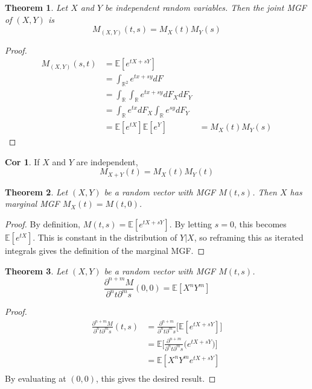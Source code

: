 \documentclass{article}
\newtheorem{theorem}{Theorem}
\theoremstyle{definition}\newtheorem{definition}{DEF}
\theoremstyle{lemma}\newtheorem{lemma}{Lemma}
\theoremstyle{corrolary}\newtheorem{corrolary}{Cor}
\begin{document}
\begin{theorem}
Let $X$ and $Y$ be independent random variables.
Then the joint MGF of $(X,Y)$ is
\begin{equation}
M_{(X,Y)}(t,s)=M_X(t)M_Y(s)
\end{equation}
\end{theorem}
\begin{proof}
\begin{align*}
M_{(X,Y)}(s,t)&=\mathbb{E}[e^{tX+sY}]\\
&=\int_{\mathbb{R}^2}e^{tx+sy}dF\\
&= \int_\mathbb{R}\int_\mathbb{R} e^{tx+sy}dF_X dF_Y\\
&=\int_\mathbb{R}e^{tx}dF_X \int_\mathbb{R} e^{sy}dF_Y\\
&=\mathbb{E}[e^{tX}] \mathbb{E}[e^{Y}]
&=M_X(t)M_Y(s)
\end{align*}
\end{proof}
\begin{corrolary}
If $X$ and $Y$ are independent,
\begin{equation}
M_{X+Y}(t)=M_X(t)M_Y(t)
\end{equation}
\end{corrolary}

\begin{theorem}
Let $(X,Y)$ be a random vector with MGF $M(t,s)$.
Then $X$ has marginal MGF $M_X(t)=M(t,0)$.
\end{theorem}
\begin{proof}
By definition, $M(t,s)=\mathbb{E}[e^{tX+sY}]$.
By letting $s=0$, this becomes $\mathbb{E}[e^{tX}]$.
This is constant in the distribution of $Y|X$, so reframing this as iterated integrals gives the definition of the marginal MGF.
\end{proof}

\begin{theorem}
Let $(X,Y)$ be a random vector with MGF $M(t,s)$.
\begin{equation}
\frac{\partial^{n+m}M}{\partial^n t \partial^m s}(0,0) = \mathbb{E}\left[ X^n Y^m \right]
\end{equation}
\end{theorem}
\begin{proof}
\begin{align*}
\frac{\partial^{n+m}M}{\partial^n t \partial^m s}(t,s)&=\frac{\partial^{n+m}}{\partial^n t \partial^m s}\bigg[ \mathbb{E}[e^{tX+sY}]\bigg]\\
&=\mathbb{E}\bigg[\frac{\partial^{n+m}}{\partial^n t \partial^m s}\bigg( e^{tX+sY}\bigg)\bigg]\\
&=\mathbb{E}[X^n Y^m e^{tX+sY}]\\
\end{align*}
By evaluating at $(0,0)$, this gives the desired result.
\end{proof}
\end{document}
